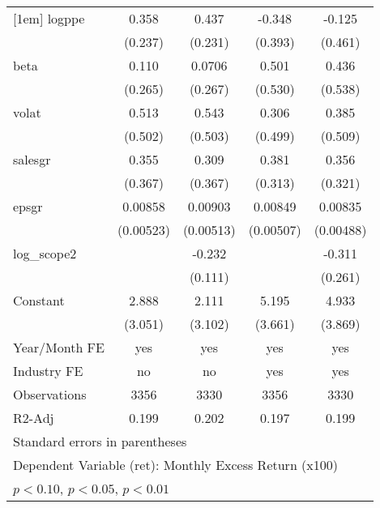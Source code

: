 \begin{table}[htbp]
\begin{tabular}{l*{4}{c}}
[1em]
logppe              &       0.358         &       0.437\sym{*}  &      -0.348         &      -0.125         \\
                    &     (0.237)         &     (0.231)         &     (0.393)         &     (0.461)         \\
[1em]
beta                &       0.110         &      0.0706         &       0.501         &       0.436         \\
                    &     (0.265)         &     (0.267)         &     (0.530)         &     (0.538)         \\
[1em]
volat               &       0.513         &       0.543         &       0.306         &       0.385         \\
                    &     (0.502)         &     (0.503)         &     (0.499)         &     (0.509)         \\
[1em]
salesgr             &       0.355         &       0.309         &       0.381         &       0.356         \\
                    &     (0.367)         &     (0.367)         &     (0.313)         &     (0.321)         \\
[1em]
epsgr               &     0.00858         &     0.00903\sym{*}  &     0.00849\sym{*}  &     0.00835\sym{*}  \\
                    &   (0.00523)         &   (0.00513)         &   (0.00507)         &   (0.00488)         \\
[1em]
log\_scope2          &                     &      -0.232\sym{**} &                     &      -0.311         \\
                    &                     &     (0.111)         &                     &     (0.261)         \\
[1em]
Constant            &       2.888         &       2.111         &       5.195         &       4.933         \\
                    &     (3.051)         &     (3.102)         &     (3.661)         &     (3.869)         \\
\hline
Year/Month FE       &         yes         &         yes         &         yes         &         yes         \\
Industry FE         &          no         &          no         &         yes         &         yes         \\
Observations        &        3356         &        3330         &        3356         &        3330         \\
R2-Adj              &       0.199         &       0.202         &       0.197         &       0.199         \\
\hline\hline
\multicolumn{5}{l}{\footnotesize Standard errors in parentheses}\\
\multicolumn{5}{l}{\footnotesize Dependent Variable (ret): Monthly Excess Return (x100)}\\
\multicolumn{5}{l}{\footnotesize \sym{*} \(p<0.10\), \sym{**} \(p<0.05\), \sym{***} \(p<0.01\)}\\
\end{tabular}
\end{table}

